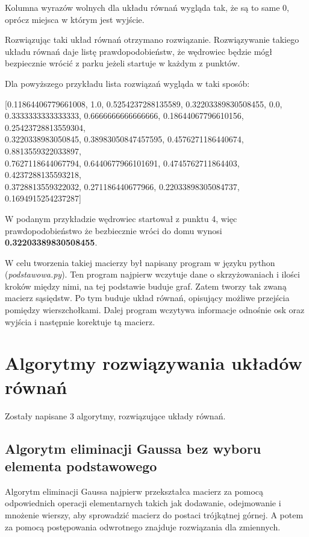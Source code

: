 \documentclass[12pt,a4paper]{article}
\begin{document}
Kolumna wyrazów wolnych dla układu równań wygląda tak, że są to same 0, oprócz miejsca w którym jest wyjście.

Rozwiązując taki układ równań otrzymano rozwiązanie. Rozwiązywanie takiego układu równań daje listę prawdopodobieństw, że wędrowiec będzie mógł bezpiecznie wrócić z parku jeżeli startuje w każdym z punktów.

Dla powyższego przykładu lista rozwiązań wygląda w taki sposób: 

[0.11864406779661008, 1.0, 0.5254237288135589, 0.32203389830508455, 0.0, \\
0.3333333333333333, 0.6666666666666666, 0.18644067796610156, 0.25423728813559304, \\
0.3220338983050845, 0.38983050847457595, 0.4576271186440674, 0.8813559322033897, \\
0.7627118644067794, 0.6440677966101691, 0.4745762711864403, 0.4237288135593218, \\
0.3728813559322032, 0.271186440677966, 0.22033898305084737, 0.1694915254237287]

W podanym przykładzie wędrowiec startował z punktu 4, więc prawdopodobieństwo że bezbiecznie wróci do domu wynosi \textbf{0.32203389830508455}.


W celu tworzenia takiej macierzy był napisany program w języku python (\textit{podstawowa.py}). Ten program najpierw wczytuje dane o skrzyżowaniach i ilości kroków między nimi, na tej podstawie buduje graf. Zatem tworzy tak zwaną macierz sąsiędstw. Po tym buduje układ równań, opisujący możliwe przejścia pomiędzy wierszchołkami. Dalej program wczytywa informacje odnośnie osk oraz wyjścia i następnie korektuje tą macierz.


\newpage
\section{Algorytmy rozwiązywania układów równań}

Zostały napisane 3 algorytmy, rozwiązujące układy równań.

\subsection{Algorytm eliminacji Gaussa bez wyboru elementa podstawowego}

Algorytm eliminacji Gaussa najpierw przekształca macierz za pomocą odpowiednich operacji elementarnych takich jak dodawanie, odejmowanie i mnożenie wierszy, aby sprowadzić macierz do postaci trójkątnej górnej. A potem za pomocą postępowania odwrotnego znajduje rozwiązania dla zmiennych.
\end{document}

